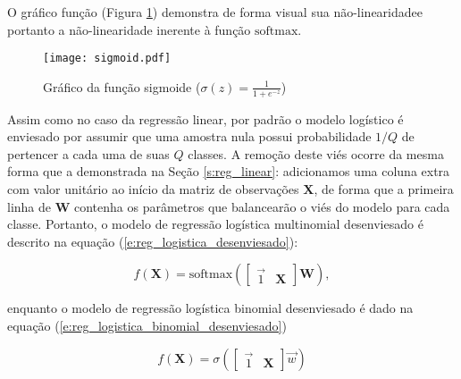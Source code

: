     \DIFdelbegin %
\DIFdelend O gráfico \DIFdelbegin {}\DIFdelend \DIFaddbegin {}\DIFaddend função \DIFaddbegin {}\DIFaddend (Figura \ref{f:sigmoid}) demonstra de forma visual sua não-linearidade\DIFaddbegin \DIFadd{, }\DIFaddend e portanto a não-linearidade inerente à função $\text{softmax}$.

    \begin{figure}
      \begin{center}
        \DIFdelbeginFL %
\DIFdelendFL \DIFaddbeginFL \texttt{[image: sigmoid.pdf]}
      \DIFaddendFL \end{center}
      \caption{Gráfico da função sigmoide ($\sigma(z) = \frac{1}{1+e^{-z}}$)}
      \label{f:sigmoid}
    \end{figure}

    Assim como no caso da regressão linear, por padrão o modelo logístico é enviesado por assumir que uma amostra nula possui probabilidade $1/Q$ de pertencer a cada uma de suas $Q$ classes. A remoção deste viés ocorre da mesma forma que a demonstrada na Seção \ref{s:reg_linear}: adicionamos uma coluna extra com valor unitário ao início da matriz de observações $\boldsymbol{X}$, de forma que a primeira linha de $\boldsymbol{W}$ contenha os parâmetros que balancearão o viés do modelo para cada classe. Portanto, o modelo de regressão logística multinomial desenviesado é descrito na equação (\ref{e:reg_logistica_desenviesado}):

    \begin{equation} \label{e:reg_logistica_desenviesado}
      f(\boldsymbol{X}) =
      \text{softmax}\left(
        \begin{bmatrix}
          \vec{1} & \boldsymbol{X}
        \end{bmatrix} \boldsymbol{W}
        \right)
      ,
    \end{equation}

    \noindent enquanto o modelo de regressão logística binomial desenviesado é dado na equação (\ref{e:reg_logistica_binomial_desenviesado})

    \begin{equation} \label{e:reg_logistica_binomial_desenviesado}
      f(\boldsymbol{X}) =
      \sigma\left(
        \begin{bmatrix}
          \vec{1} & \boldsymbol{X}
        \end{bmatrix} \vec{w}
        \right)
    \end{equation}

